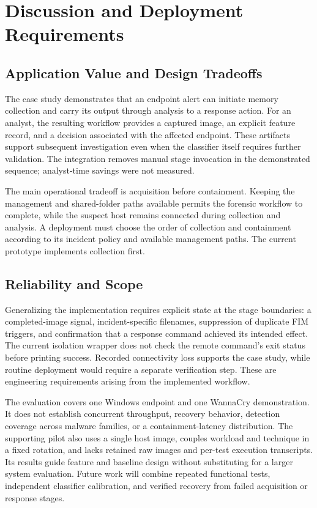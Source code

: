 \documentclass[conference]{IEEEtran}
\begin{document}
\section{Discussion and Deployment Requirements}
\label{sec:discussion}

\subsection{Application Value and Design Tradeoffs}
The case study demonstrates that an endpoint alert can initiate memory
collection and carry its output through analysis to a response action. For an
analyst, the resulting workflow provides a captured image, an explicit feature
record, and a decision associated with the affected endpoint. These artifacts
support subsequent investigation even when the classifier itself requires
further validation. The integration removes manual stage invocation in the
demonstrated sequence; analyst-time savings were not measured.

The main operational tradeoff is acquisition before containment. Keeping the
management and shared-folder paths available permits the forensic workflow to
complete, while the suspect host remains connected during collection and
analysis. A deployment must choose the order of collection and containment
according to its incident policy and available management paths. The current
prototype implements collection first.

\subsection{Reliability and Scope}
Generalizing the implementation requires explicit state at the stage boundaries:
a completed-image signal, incident-specific filenames, suppression of duplicate
FIM triggers, and confirmation that a response command achieved its intended
effect. The current isolation wrapper does not check the remote command's exit
status before printing success. Recorded connectivity loss supports the case
study, while routine deployment would require a separate verification step.
These are engineering requirements arising from the implemented workflow.

The evaluation covers one Windows endpoint and one WannaCry demonstration.
It does not establish concurrent throughput, recovery behavior, detection
coverage across malware families, or a containment-latency distribution. The
supporting pilot also uses a single host image, couples workload and technique
in a fixed rotation, and lacks retained raw images and per-test execution
transcripts. Its results guide feature and baseline design without substituting
for a larger system evaluation. Future work will combine repeated functional
tests, independent classifier calibration, and verified recovery from failed
acquisition or response stages.
\end{document}
